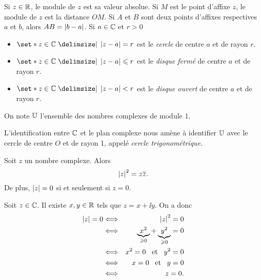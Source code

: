 \documentclass{magnolia}
\begin{document}
\begin{remarques}
\remarque Si $z\in\mathbb{R}$, le module de $z$ est sa valeur absolue.
\remarque Si $M$ est le point d'affixe $z$, le module de $z$ est la distance $OM$. Si $A$ et $B$ sont deux points d'affixes respectives $a$ et $b$, alors $AB=\left|b-a\right|$.
\remarque Si $a\in\mathbb{C}$ et $r>0$
  \begin{itemize}
  \item $\enstq{z\in\C}{\abs{z-a}=r}$ est le \emph{cercle} de centre $a$ et de rayon $r$.
  \item $\enstq{z\in\C}{\abs{z-a}\leq r}$ est le \emph{disque fermé} de centre $a$ et de rayon $r$.
  \item $\enstq{z\in\C}{\abs{z-a}<r}$ est le \emph{disque ouvert} de centre $a$ et de rayon $r$.
  \end{itemize}
\end{remarques}

\begin{definition}[utile=-3]
On note $\U$ l'ensemble des nombres complexes de module $1$.
\end{definition}

\begin{remarqueUnique}
\remarque L'identification entre $\mathbb{C}$ et le plan complexe nous amène à identifier $\U$
  avec le cercle de centre $O$ et de rayon 1, appelé \emph{cercle trigonométrique}.
\end{remarqueUnique}

\begin{proposition}
Soit $z$ un nombre complexe. Alors
\[\left|z\right|^2=z \overline{z}.\]
De plus, $\left|z\right|=0$ si et seulement si $z=0$.
\end{proposition}
\begin{preuve}
Soit $z\in\mathbb{C}$. Il existe $x,y\in\mathbb{R}$ tels que $z=x+\ii y$. On a donc
\begin{eqnarray*}
\left|z\right|=0
&\Longleftrightarrow& \left|z\right|^2=0\\
&\Longleftrightarrow& \underbrace{x^2}_{\geqslant 0}+\underbrace{y^2}_{\geqslant 0}=0\\
&\Longleftrightarrow& x^2=0 \quad\!\text{et}\quad\! y^2=0\\
&\Longleftrightarrow& x=0 \quad\!\text{et}\quad\! y=0\\
&\Longleftrightarrow& z=0.
\end{eqnarray*}
\end{preuve}
\end{document}

